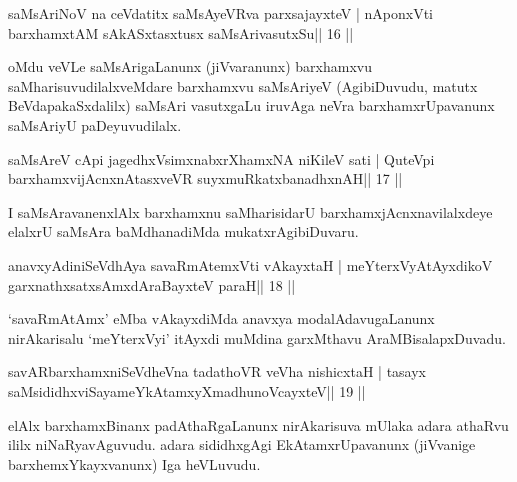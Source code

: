 \begin{shl}
saMsAriNoV na ceVdatitx saMsAyeVRva parxsajayxteV |
nA\s ponxVti barxhamxtAM sAkASxtasxtusx saMsArivasutxSu\hfill || 16 ||
\end{shl}

\begin{artha}
oMdu veVLe saMsArigaLanunx (jiVvaranunx) barxhamxvu saMharisuvudilalxveMdare barxhamxvu saMsAriyeV (AgibiDuvudu, matutx BeVdapakaSxdalilx) saMsAri vasutxgaLu iruvAga neVra barxhamxrUpavanunx saMsAriyU paDeyuvudilalx.
\end{artha}

\begin{shl}
saMsAreV cApi jagedhxV\s simxnabxrXhamxNA niKileV sati |
QuteV\s pi barxhamxvijAcnxnAtasxveVR suyxmuRkatxbanadhxnAH\hfill || 17 ||
\end{shl}

\begin{artha}
I saMsAravanenxlAlx barxhamxnu saMharisidarU barxhamxjAcnxnavilalxdeye elalxrU saMsAra baMdhanadiMda mukatxrAgibiDuvaru.
\end{artha}


\begin{shl}
anavxyAdiniSeVdhAya savaRmAtemxVti vAkayxtaH |
meYterxVyAtAyxdikoV garxnathxsatxsAmxdAraBayxteV paraH\hfill || 18 ||
\end{shl}

\begin{artha}
`savaRmAtAmx' eMba vAkayxdiMda anavxya modalAdavugaLanunx   nirAkarisalu `meYterxVyi' itAyxdi muMdina garxMthavu   AraMBisalapxDuvadu.
\end{artha}


\begin{shl}
savARbarxhamxniSeVdheVna tadathoVR veVha nishicxtaH |
tasayx saMsididhxviSayameYkAtamxyXmadhunoVcayxteV\hfill || 19 ||
\end{shl}

\begin{artha}
elAlx barxhamxBinanx padAthaRgaLanunx nirAkarisuva mUlaka adara athaRvu ililx niNaRyavAguvudu. adara sididhxgAgi EkAtamxrUpavanunx (jiVvanige barxhemxYkayxvanunx) Iga heVLuvudu.
\end{artha}


